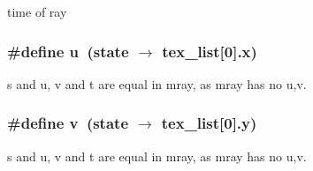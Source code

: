 time of ray 

\subsubsection{\setlength{\rightskip}{0pt plus 5cm}\#define u\ (state $\rightarrow$ tex\_\-list[0].x)}\label{mrRman__macros_8h_a9}


s and u, v and t are equal in mray, as mray has no u,v. 

\subsubsection{\setlength{\rightskip}{0pt plus 5cm}\#define v\ (state $\rightarrow$ tex\_\-list[0].y)}\label{mrRman__macros_8h_a10}


s and u, v and t are equal in mray, as mray has no u,v. 

